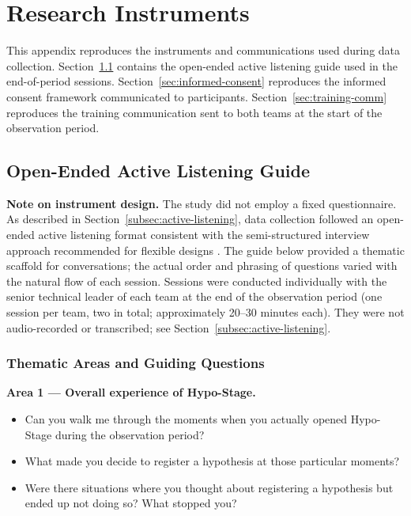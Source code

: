 
\chapter{Research Instruments}
\label{apx:instruments}

This appendix reproduces the instruments and communications used during data
collection. Section~\ref{sec:listening-guide} contains the open-ended active
listening guide used in the end-of-period sessions.
Section~\ref{sec:informed-consent} reproduces the informed consent framework
communicated to participants. Section~\ref{sec:training-comm} reproduces the
training communication sent to both teams at the start of the observation period.

\section{Open-Ended Active Listening Guide}
\label{sec:listening-guide}

\textbf{Note on instrument design.} The study did not employ a fixed
questionnaire. As described in Section~\ref{subsec:active-listening}, data collection followed an
open-ended active listening format consistent with the semi-structured
interview approach recommended for flexible designs \citep{robson2016}.
The guide below provided a thematic scaffold for conversations; the actual
order and phrasing of questions varied with the natural flow of each session.
Sessions were conducted individually with the senior technical leader of each
team at the end of the observation period (one session per team, two in total;
approximately 20--30 minutes each). They were not audio-recorded or transcribed;
see Section~\ref{subsec:active-listening}.

\subsection*{Thematic Areas and Guiding Questions}

\textbf{Area 1 --- Overall experience of Hypo-Stage.}
\begin{itemize}
  \item Can you walk me through the moments when you actually opened Hypo-Stage
    during the observation period?
  \item What made you decide to register a hypothesis at those particular
    moments?
  \item Were there situations where you thought about registering a hypothesis
    but ended up not doing so? What stopped you?
\end{itemize}

